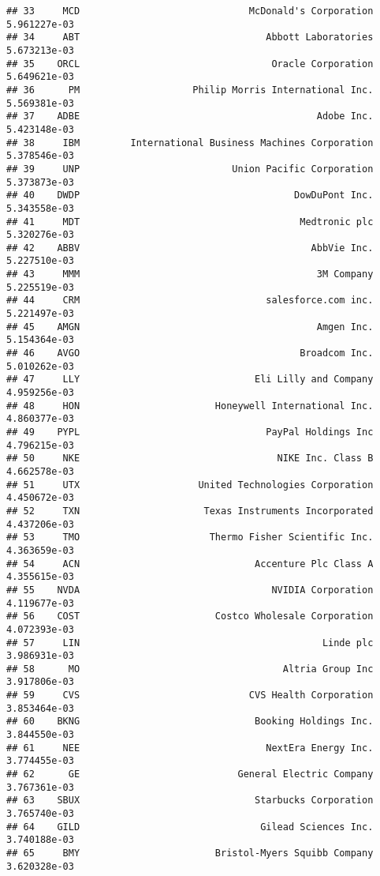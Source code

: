 \documentclass[
]{article}
\begin{document}
\begin{verbatim}
## 33     MCD                              McDonald's Corporation 5.961227e-03
## 34     ABT                                 Abbott Laboratories 5.673213e-03
## 35    ORCL                                  Oracle Corporation 5.649621e-03
## 36      PM                    Philip Morris International Inc. 5.569381e-03
## 37    ADBE                                          Adobe Inc. 5.423148e-03
## 38     IBM         International Business Machines Corporation 5.378546e-03
## 39     UNP                           Union Pacific Corporation 5.373873e-03
## 40    DWDP                                      DowDuPont Inc. 5.343558e-03
## 41     MDT                                       Medtronic plc 5.320276e-03
## 42    ABBV                                         AbbVie Inc. 5.227510e-03
## 43     MMM                                          3M Company 5.225519e-03
## 44     CRM                                 salesforce.com inc. 5.221497e-03
## 45    AMGN                                          Amgen Inc. 5.154364e-03
## 46    AVGO                                       Broadcom Inc. 5.010262e-03
## 47     LLY                               Eli Lilly and Company 4.959256e-03
## 48     HON                        Honeywell International Inc. 4.860377e-03
## 49    PYPL                                 PayPal Holdings Inc 4.796215e-03
## 50     NKE                                   NIKE Inc. Class B 4.662578e-03
## 51     UTX                     United Technologies Corporation 4.450672e-03
## 52     TXN                      Texas Instruments Incorporated 4.437206e-03
## 53     TMO                       Thermo Fisher Scientific Inc. 4.363659e-03
## 54     ACN                               Accenture Plc Class A 4.355615e-03
## 55    NVDA                                  NVIDIA Corporation 4.119677e-03
## 56    COST                        Costco Wholesale Corporation 4.072393e-03
## 57     LIN                                           Linde plc 3.986931e-03
## 58      MO                                    Altria Group Inc 3.917806e-03
## 59     CVS                              CVS Health Corporation 3.853464e-03
## 60    BKNG                               Booking Holdings Inc. 3.844550e-03
## 61     NEE                                 NextEra Energy Inc. 3.774455e-03
## 62      GE                            General Electric Company 3.767361e-03
## 63    SBUX                               Starbucks Corporation 3.765740e-03
## 64    GILD                                Gilead Sciences Inc. 3.740188e-03
## 65     BMY                        Bristol-Myers Squibb Company 3.620328e-03

\end{verbatim}
\end{document}

